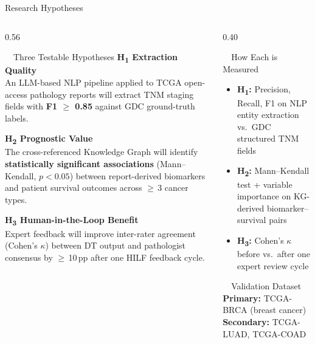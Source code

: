 \documentclass[aspectratio=169, 10pt]{beamer}
\begin{document}
\begin{frame}{Research Hypotheses}

\begin{columns}[T]
\begin{column}{0.56\textwidth}

\begin{alertblock}{\faFlask\ \ Three Testable Hypotheses}
\small
\textbf{H\textsubscript{1}  Extraction Quality}\\
An LLM-based NLP pipeline applied to TCGA open-access pathology reports will extract TNM staging fields with \textbf{F1 $\geq$ 0.85} against GDC ground-truth labels.

\vspace{8pt}
\textbf{H\textsubscript{2}  Prognostic Value}\\
The cross-referenced Knowledge Graph will identify \textbf{statistically significant associations} (Mann--Kendall, $p < 0.05$) between report-derived biomarkers and patient survival outcomes across $\geq$\,3 cancer types.

\vspace{8pt}
\textbf{H\textsubscript{3}  Human-in-the-Loop Benefit}\\
Expert feedback will improve inter-rater agreement (Cohen's $\kappa$) between DT output and pathologist consensus by $\geq$\,10\,pp after one HILF feedback cycle.
\end{alertblock}

\end{column}

\begin{column}{0.40\textwidth}

\begin{block}{\faChartBar\ \ How Each is Measured}
\small
\begin{itemize}\setlength{\itemsep}{6pt}
    \item \textbf{H\textsubscript{1}:} Precision, Recall, F1 on NLP entity extraction vs.\ GDC structured TNM fields
    \item \textbf{H\textsubscript{2}:} Mann--Kendall test + variable importance on KG-derived biomarker--survival pairs
    \item \textbf{H\textsubscript{3}:} Cohen's $\kappa$ before vs.\ after one expert review cycle
\end{itemize}
\end{block}

\vspace{6pt}
\begin{exampleblock}{\faDatabase\ \ Validation Dataset}
\small
\textbf{Primary:} TCGA-BRCA (breast cancer)\\
\textbf{Secondary:} TCGA-LUAD, TCGA-COAD\\
\end{exampleblock}

\end{column}
\end{columns}

\end{frame}
\end{document}
